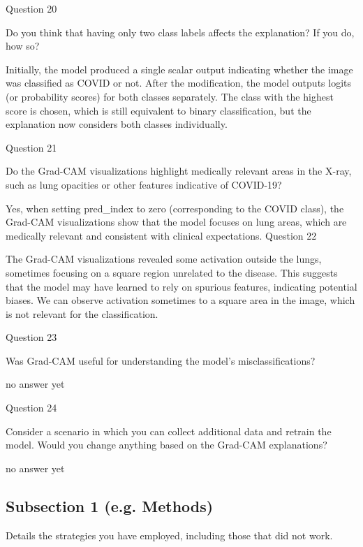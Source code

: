 \documentclass[conference]{IEEEtran}
\begin{document}
Question 20

Do you think that having only two class labels affects the explanation? If you do, how so?

Initially, the model produced a single scalar output indicating whether the image was classified as COVID or not.
After the modification, the model outputs logits (or probability scores) for both classes separately. The class with the highest score is chosen, which is still equivalent to binary classification, but the explanation now considers both classes individually.

Question 21

Do the Grad-CAM visualizations highlight medically relevant areas in the X-ray, such as lung opacities or other features indicative of COVID-19?

Yes, when setting pred\_index to zero (corresponding to the COVID class), the Grad-CAM visualizations show that the model focuses on lung areas, which are medically relevant and consistent with clinical expectations.
Question 22

The Grad-CAM visualizations revealed some activation outside the lungs, sometimes focusing on a square region unrelated to the disease. This suggests that the model may have learned to rely on spurious features, indicating potential biases.
We can observe activation sometimes to a square area in the image, which is not relevant for the classification.

Question 23

Was Grad-CAM useful for understanding the model’s misclassifications?

no answer yet

Question 24

Consider a scenario in which you can collect additional data and retrain the model. Would you change anything based on the Grad-CAM explanations?

no answer yet

\subsection{Subsection 1 (e.g. Methods)}
 Details the strategies you have employed, including those that did not work.
\end{document}
